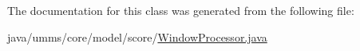 The documentation for this class was generated from the following file\+:\begin{DoxyCompactItemize}
\item 
java/umms/core/model/score/\hyperlink{_window_processor_8java}{Window\+Processor.\+java}\end{DoxyCompactItemize}

